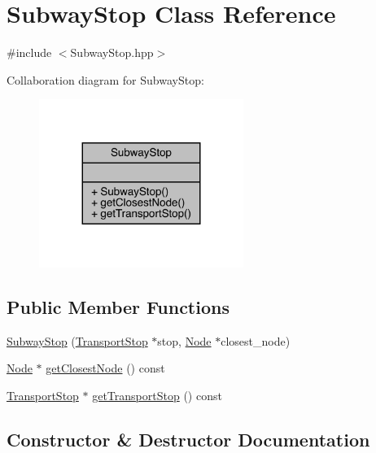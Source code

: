 \hypertarget{class_subway_stop}{}\section{Subway\+Stop Class Reference}
\label{class_subway_stop}


{\ttfamily \#include $<$Subway\+Stop.\+hpp$>$}



Collaboration diagram for Subway\+Stop\+:
\nopagebreak
\begin{figure}[H]
\begin{center}
\leavevmode
\includegraphics[width=188pt]{class_subway_stop__coll__graph}
\end{center}
\end{figure}
\subsection*{Public Member Functions}
\begin{DoxyCompactItemize}
\item 
\hyperlink{class_subway_stop_ae29e3908fe6203af1123150c03b026fe}{Subway\+Stop} (\hyperlink{class_transport_stop}{Transport\+Stop} $\ast$stop, \hyperlink{class_node}{Node} $\ast$closest\+\_\+node)
\item 
\hyperlink{class_node}{Node} $\ast$ \hyperlink{class_subway_stop_a575f9f1c940378cb193b2690ad972cf8}{get\+Closest\+Node} () const
\item 
\hyperlink{class_transport_stop}{Transport\+Stop} $\ast$ \hyperlink{class_subway_stop_a5cc277b4da7f0decf74518de16b2966b}{get\+Transport\+Stop} () const
\end{DoxyCompactItemize}


\subsection{Constructor \& Destructor Documentation}
\hypertarget{class_subway_stop_ae29e3908fe6203af1123150c03b026fe}{}\label{class_subway_stop_ae29e3908fe6203af1123150c03b026fe} 
